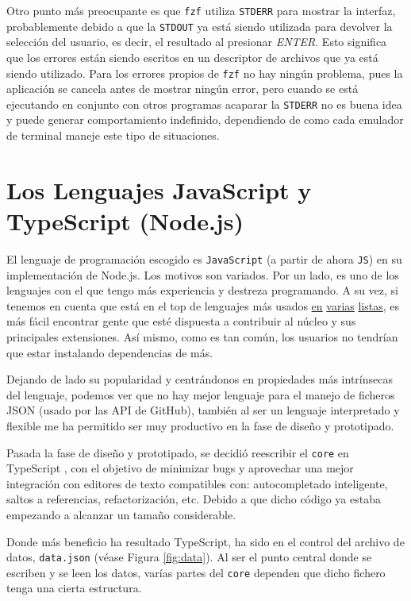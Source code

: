 Otro punto más preocupante es que \verb|fzf| utiliza \verb|STDERR| para mostrar la interfaz, probablemente debido a que la \verb|STDOUT| ya está siendo utilizada para devolver la selección del usuario, es decir, el resultado al presionar \emph{ENTER}. Esto significa que los errores están siendo escritos en un descriptor de archivos que ya está siendo utilizado. Para los errores propios de \verb|fzf| no hay ningún problema, pues la aplicación se cancela antes de mostrar ningún error, pero cuando se está ejecutando en conjunto con otros programas acaparar la \verb|STDERR| no es buena idea y puede generar comportamiento indefinido, dependiendo de como cada emulador de terminal maneje este tipo de situaciones.

\section{Los Lenguajes JavaScript y TypeScript (Node.js)}
El lenguaje de programación escogido es \verb|JavaScript|\cite{js} (a partir de ahora \verb|JS|) en su implementación de Node.js. Los motivos son variados. Por un lado, es uno de los lenguajes con el que tengo más experiencia y destreza programando. A su vez, si tenemos en cuenta que está en el top de lenguajes más usados \href{https://www.jetbrains.com/es-es/lp/devecosystem-2021/#Main_programming-languages}{en} \href{https://insights.stackoverflow.com/survey/2021#technology-most-popular-technologies}{varias} \href{https://www.tiobe.com/tiobe-index/}{listas}, es más fácil encontrar gente que esté dispuesta a contribuir al núcleo y sus principales extensiones. Así mismo, como es tan común, los usuarios no tendrían que estar instalando dependencias de más.

Dejando de lado su popularidad y centrándonos en propiedades más intrínsecas del lenguaje, podemos ver que no hay mejor lenguaje para el manejo de ficheros JSON (usado por las API de GitHub), también al ser un lenguaje interpretado y flexible me ha permitido ser muy productivo en la fase de diseño y prototipado.

Pasada la fase de diseño y prototipado, se decidió reescribir el \verb|core| en TypeScript \cite{ts}, con el objetivo de minimizar bugs y aprovechar una mejor integración con editores de texto compatibles con: autocompletado inteligente, saltos a referencias, refactorización, etc. Debido a que dicho código ya estaba empezando a alcanzar un tamaño considerable.

Donde más beneficio ha resultado TypeScript,
ha sido en el control del archivo de datos, 
{\tt data.json} (véase Figura \ref{fig:data}).
Al ser el punto central donde se escriben y 
se leen los datos, varías partes del \verb|core| 
dependen que dicho fichero tenga una cierta estructura. 

